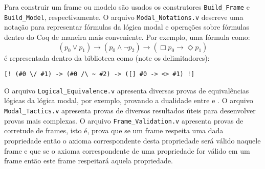         Para construir um frame ou modelo são usados os construtores \texttt{Build\_Frame} e \texttt{Build\_Model}, respectivamente.
        O arquivo \texttt{Modal\_Notations.v} descreve uma notação para representar fórmulas da lógica modal e operações sobre fórmulas
        dentro do Coq de maneira mais conveniente. Por exemplo, uma fórmula como:
        \[
            (p_0 \lor p_1) \to (p_0 \land \neg p_2) \to (\Box p_0 \to \Diamond p_1)
        \]
        é representada dentro da biblioteca como (note os delimitadores):
        \begin{lstlisting}[basicstyle=\ttfamily,columns=fullflexible]
    [! (#0 \/ #1) -> (#0 /\ ~ #2) -> ([] #0 -> <> #1) !]
        \end{lstlisting}

        O arquivo \texttt{Logical\_Equivalence.v} apresenta diversas provas de equivalências lógicas da lógica modal, por exemplo, provando
        a dualidade entre \BOX e \DIA. O arquivo \texttt{Modal\_Tactics.v} apresenta provas de diversos resultados úteis para desenvolver
        provas mais complexas. O arquivo \texttt{Frame\_Validation.v} apresenta provas de corretude de frames, isto é, prova que
        se um frame respeita uma dada propriedade então o axioma correspondente desta propriedade será válido naquele frame e
        que se o axioma correspondente de uma propriedade for válido em um frame então este frame respeitará aquela propriedade.

